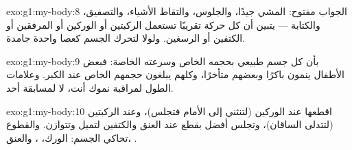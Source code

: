 \begin{solution}{exo:g1:my-body:8}
الجواب مفتوح: المشي جيدًا، والجلوس، والتقاط الأشياء، والتصفيق،
والكتابة --- يتبين أن كل حركة تقريبًا تستعمل الركبتين أو الوركين
أو المرفقين أو الكتفين أو الرسغين. ولولا  لتحرك الجسم
كعصا واحدة جامدة.
\end{solution}

\begin{solution}{exo:g1:my-body:9}
بأن كل جسم طبيعي بحجمه الخاص وسرعته الخاصة: فبعض الأطفال ينمون
باكرًا وبعضهم متأخرًا، وكلهم يبلغون حجمهم الخاص عند الكبر.
وعلامات الطول لمراقبة نموك أنت، لا لمسابقة أحد.
\end{solution}

\begin{solution}{exo:g1:my-body:10}
اقطعها عند الوركين (لتنثني  إلى الأمام فتجلس)، وعند
الركبتين (لتتدلى الساقان)، وتجلس أفضل بقطع عند العنق والكتفين
لتميل وتتوازن. والقطوع تحاكي  الجسم: الورك، ، والعنق،
.
\end{solution}
